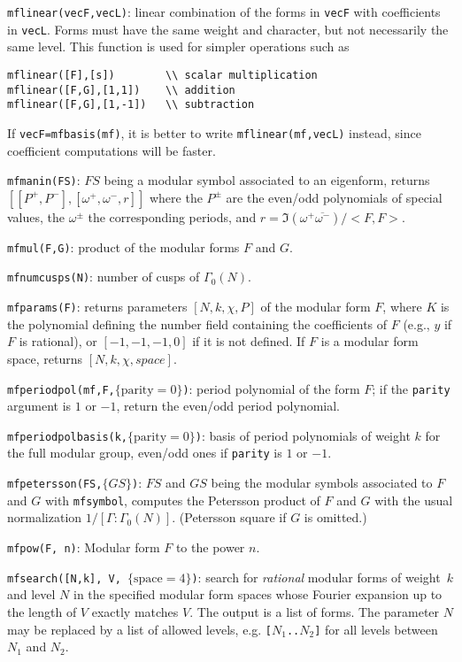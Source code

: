 \documentclass[11pt]{article}
\newcommand{\G}{\Gamma}
\def\kbd#1{{\tt #1}}
\begin{document}
\f\kbd{mflinear(vecF,vecL)}: linear combination of the forms in \kbd{vecF}
with coefficients in \kbd{vecL}. Forms must have the same weight and
character, but not necessarily the same level. This function is used
for simpler operations such as
\begin{verbatim}
mflinear([F],[s])        \\ scalar multiplication
mflinear([F,G],[1,1])    \\ addition
mflinear([F,G],[1,-1])   \\ subtraction
\end{verbatim}
If \kbd{vecF=mfbasis(mf)}, it is better to write \kbd{mflinear(mf,vecL)}
instead, since coefficient computations will be faster.

\f\kbd{mfmanin(FS)}: $FS$ being a modular symbol associated to an eigenform,
returns $[[P^+,P^-],[\omega^+,\omega^-,r]]$ where the $P^{\pm}$ are the
even/odd polynomials of special values, the $\omega^{\pm}$ the
corresponding periods, and $r=\Im(\omega^+\overline{\omega^-})/<F,F>$.

\f\kbd{mfmul(F,G)}: product of the modular forms $F$ and $G$.

\f\kbd{mfnumcusps(N)}: number of cusps of $\G_0(N)$.

\f\kbd{mfparams(F)}: returns parameters $[N,k,\chi,P]$ of the modular form $F$,
where $K$ is the polynomial defining the number field containing the
coefficients of $F$ (e.g., $y$ if $F$ is rational), or $[-1,-1,-1,0]$ if
it is not defined. If $F$ is a modular form space, returns $[N,k,\chi,space]$.

\f\kbd{mfperiodpol(mf,F,$\{\text{parity}=0\}$)}: period polynomial of the
form $F$; if the \kbd{parity} argument is $1$ or $-1$, return the even/odd
period polynomial.

\f\kbd{mfperiodpolbasis(k,$\{\text{parity}=0\}$)}: basis of period polynomials of weight
$k$ for the full modular group, even/odd ones if \kbd{parity} is $1$ or $-1$.

\f\kbd{mfpetersson(FS,$\{GS\}$)}: $FS$ and $GS$ being the modular symbols associated
to $F$ and $G$ with \kbd{mfsymbol}, computes the Petersson product of $F$ and
$G$ with the usual normalization $1/[\G:\G_0(N)]$. (Petersson square if $G$
is omitted.)

\f\kbd{mfpow(F, n)}: Modular form $F$ to the power $n$.

\f\kbd{mfsearch([N,k], V, $\{\text{space}=4\}$)}: search for \emph{rational}
modular forms of weight~$k$ and level $N$ in the specified modular
form spaces whose Fourier expansion up to the length of $V$ exactly matches
$V$. The output is a list of forms. The parameter $N$ may be replaced
by a list of allowed levels, e.g. \kbd{[$N_1$..$N_2$]} for all levels
between $N_1$ and $N_2$.
\end{document}
